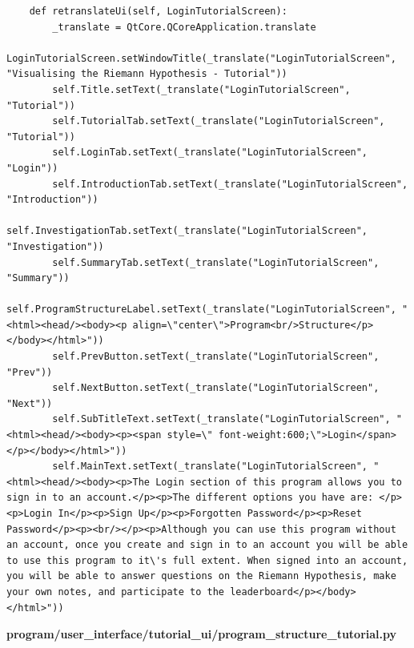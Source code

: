 \documentclass{article}
\begin{document}
\begin{lstlisting}
    def retranslateUi(self, LoginTutorialScreen):
        _translate = QtCore.QCoreApplication.translate
        LoginTutorialScreen.setWindowTitle(_translate("LoginTutorialScreen", "Visualising the Riemann Hypothesis - Tutorial"))
        self.Title.setText(_translate("LoginTutorialScreen", "Tutorial"))
        self.TutorialTab.setText(_translate("LoginTutorialScreen", "Tutorial"))
        self.LoginTab.setText(_translate("LoginTutorialScreen", "Login"))
        self.IntroductionTab.setText(_translate("LoginTutorialScreen", "Introduction"))
        self.InvestigationTab.setText(_translate("LoginTutorialScreen", "Investigation"))
        self.SummaryTab.setText(_translate("LoginTutorialScreen", "Summary"))
        self.ProgramStructureLabel.setText(_translate("LoginTutorialScreen", "<html><head/><body><p align=\"center\">Program<br/>Structure</p></body></html>"))
        self.PrevButton.setText(_translate("LoginTutorialScreen", "Prev"))
        self.NextButton.setText(_translate("LoginTutorialScreen", "Next"))
        self.SubTitleText.setText(_translate("LoginTutorialScreen", "<html><head/><body><p><span style=\" font-weight:600;\">Login</span></p></body></html>"))
        self.MainText.setText(_translate("LoginTutorialScreen", "<html><head/><body><p>The Login section of this program allows you to sign in to an account.</p><p>The different options you have are: </p><p>Login In</p><p>Sign Up</p><p>Forgotten Password</p><p>Reset Password</p><p><br/></p><p>Although you can use this program without an account, once you create and sign in to an account you will be able to use this program to it\'s full extent. When signed into an account, you will be able to answer questions on the Riemann Hypothesis, make your own notes, and participate to the leaderboard</p></body></html>"))
\end{lstlisting}

\textbf{program/user\_interface/tutorial\_ui/program\_structure\_tutorial.py}
\end{document}
